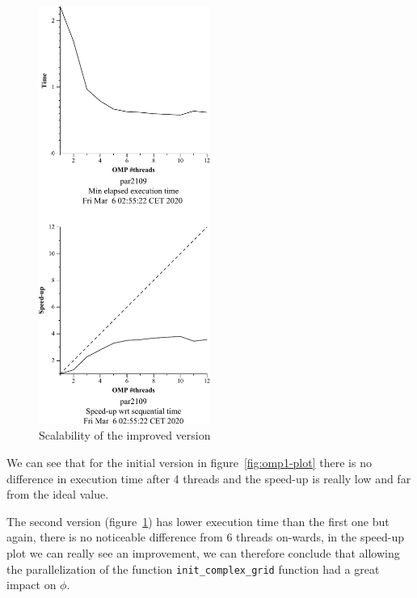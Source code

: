 \begin{figure}[H]
\begin{minipage}{.5\textwidth}
  \includegraphics[width=0.5\textwidth]{./data/3dfft_/3dfft_omp-strong-2.pdf}
  \caption{Scalability of the improved version}%
  \label{fig:omp2-plot}
\end{minipage}
\end{figure}

We can see that for the initial version in figure~\ref{fig:omp1-plot} there is no difference in execution time 
after 4 threads and the speed-up is really low and far from the ideal value.

The second version (figure~\ref{fig:omp2-plot}) has lower execution
time than the first one but again, there is no noticeable difference from 6 threads on-wards, in the speed-up plot we can really see an improvement, we can therefore conclude that allowing the parallelization of the function \texttt{init\_complex\_grid} function had a great impact on $\phi$.

